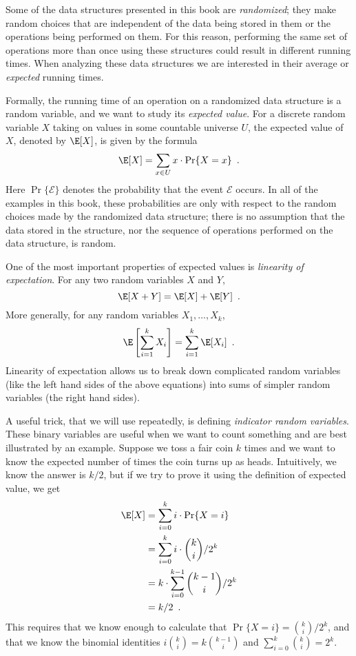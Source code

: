 %
%
%
%
Some of the data structures presented in this book are \emph{randomized};
they make random choices that are independent of the data being stored
in them or the operations being performed on them.  For this reason,
performing the same set of operations more than once using these
structures could result in different running times.  When analyzing these
data structures we are interested in their average or \emph{expected}
running times.
%
%

Formally, the running time of an operation on a randomized data structure
is a random variable, and we want to study its \emph{expected value}.
%
For
a discrete random variable $X$ taking on values in some countable
universe $U$, the expected value of $X$, denoted by $\E[X]$, is given
by the formula
\[
    \E[X] = \sum_{x\in U} x\cdot\Pr\{X=x\} \enspace .
\]
Here $\Pr\{\mathcal{E}\}$ denotes the probability that the event
$\mathcal{E}$ occurs.  In all of the examples in this book, these
probabilities are only with respect to the random choices made by the
randomized data structure;  there is no assumption that the data stored
in the structure, nor the sequence of operations performed on the
data structure, is random.

One of the most important properties of expected values is \emph{linearity
of expectation}.
%
For any two random variables $X$ and $Y$,
\[
   \E[X+Y] = \E[X] + \E[Y] \enspace .
\]
More generally, for any random variables $X_1,\ldots,X_k$,
\[
   \E\left[\sum_{i=1}^k X_i\right] = \sum_{i=1}^k \E[X_i] \enspace .
\]
Linearity of expectation allows us to break down complicated random variables (like the left hand sides of the above equations) into sums of simpler random variables (the right hand sides).

A useful trick, that we will use repeatedly, is defining \emph{indicator
random variables}.
%
These binary variables are useful when we want to
count something and are best illustrated by an example.  Suppose we toss
a fair coin $k$ times and we want to know the expected number of times
the coin turns up as heads.
%
Intuitively, we know the answer is $k/2$,
but if we try to prove it using the definition of expected value, we get
\begin{align*}
   \E[X] & = \sum_{i=0}^k i\cdot\Pr\{X=i\} \\
         & = \sum_{i=0}^k i\cdot\binom{k}{i}/2^k \\
         & = k\cdot \sum_{i=0}^{k-1}\binom{k-1}{i}/2^k \\
         & = k/2 \enspace .
\end{align*}
This requires that we know enough to calculate that $\Pr\{X=i\}
= \binom{k}{i}/2^k$, and that we know the binomial identities
$i\binom{k}{i}=k\binom{k-1}{i}$ and $\sum_{i=0}^{k} \binom{k}{i} = 2^{k}$.

